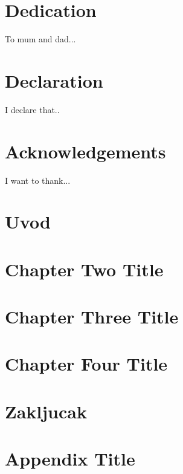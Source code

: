 \documentclass[12pt, twoside]{report}
\begin{document}


\chapter*{Dedication}
To mum and dad...

\chapter*{Declaration}
I declare that..

\chapter*{Acknowledgements}
I want to thank...

\tableofcontents

\listoffigures

\listoftables



\chapter{Uvod}


\chapter{Chapter Two Title}


\chapter{Chapter Three Title}


\chapter{Chapter Four Title}


\chapter{Zakljucak}


\appendix
\chapter{Appendix Title}


\printbibliography
\end{document}

